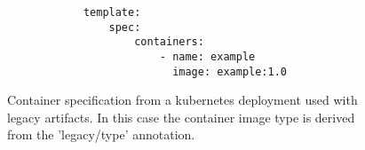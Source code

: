 \documentclass[../main.tex]{subfiles}
\begin{document}
    \begin{figure}[h]
        \begin{verbatim}
            template:
                spec:
                    containers:
                        - name: example
                          image: example:1.0
        \end{verbatim}
        \captionsetup{justification=centering}
        \caption{
            Container specification from a \gls{kubernetes} deployment used with legacy artifacts.
        In this case the container image type is derived from the 'legacy/type' annotation.
        }
        \label{lst:image_spec}
    \end{figure}
\end{document}
